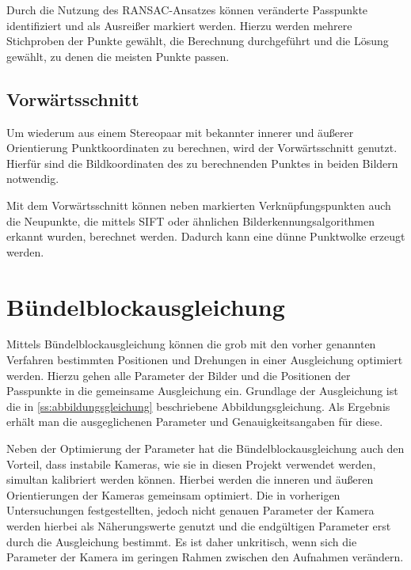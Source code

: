 \documentclass[./00PhotoBox.tex]{subfiles}
\begin{document}
Durch die Nutzung des RANSAC-Ansatzes können veränderte Passpunkte identifiziert und als Ausreißer markiert werden. Hierzu werden mehrere Stichproben der Punkte gewählt, die Berechnung durchgeführt und die Lösung gewählt, zu denen die meisten Punkte passen. \citep[S. 134]{luhmann}


\subsection{Vorwärtsschnitt}
Um wiederum aus einem Stereopaar mit bekannter innerer und äußerer Orientierung Punktkoordinaten zu berechnen, wird der Vorwärtsschnitt genutzt. Hierfür sind die Bildkoordinaten des zu berechnenden Punktes in beiden Bildern notwendig.

Mit dem Vorwärts\-schnitt können neben markierten Verknüpfungspunkten auch die Neupunkte, die mittels SIFT oder ähnlichen Bild\-erkennungs\-algorithmen erkannt wurden, berechnet werden. Dadurch kann eine dünne Punktwolke erzeugt werden.

\section{Bündelblockausgleichung}
\label{s:buendelblock}
Mittels Bündelblockausgleichung können die grob mit den vorher genannten Verfahren bestimmten Positionen und Drehungen in einer Ausgleichung optimiert werden. Hierzu gehen alle Parameter der Bilder und die Positionen der Passpunkte in die gemeinsame Ausgleichung ein. Grundlage der Ausgleichung ist die in \autoref{ss:abbildungsgleichung} beschriebene Abbildungsgleichung. Als Ergebnis erhält man die ausgeglichenen Parameter und Genauigkeitsangaben für diese. \citep[S. 343ff]{luhmann}

Neben der Optimierung der Parameter hat die Bündelblockausgleichung auch den Vorteil, dass instabile Kameras, wie sie in diesen Projekt verwendet werden, simultan kalibriert werden können. Hierbei werden die inneren und äußeren Orientierungen der Kameras gemeinsam optimiert. Die in vorherigen Untersuchungen festgestellten, jedoch nicht genauen Parameter der Kamera werden hierbei als Näherungswerte genutzt und die endgültigen Parameter erst durch die Ausgleichung bestimmt. Es ist daher unkritisch, wenn sich die Parameter der Kamera im geringen Rahmen zwischen den Aufnahmen verändern. \citep[S. 357f]{luhmann}
\end{document}
